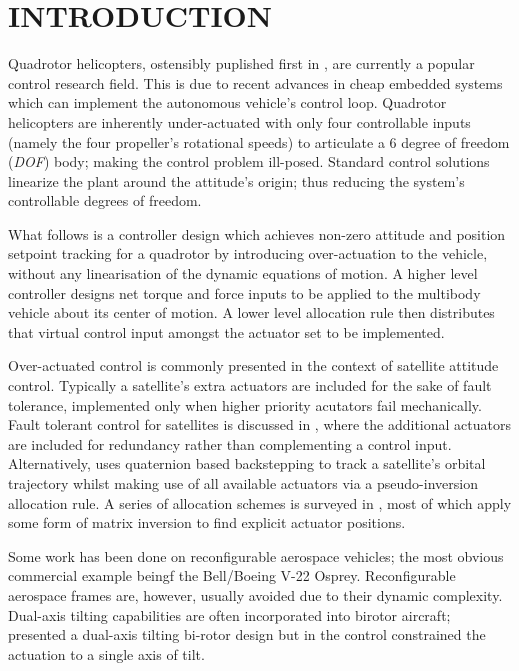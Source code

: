 \documentclass[a4paper, 10pt, conference]{ieeeconf}
\begin{document}
\section{INTRODUCTION}
Quadrotor helicopters, ostensibly puplished first in \cite{x4flyer}, are currently a popular control research field. This is due to recent advances in cheap embedded systems which can implement the autonomous vehicle's control loop. Quadrotor helicopters are inherently under-actuated with only four controllable inputs (namely the four propeller's rotational speeds) to articulate a 6 degree of freedom (\emph{DOF}) body; making the control problem ill-posed. Standard control solutions linearize the plant around the attitude's origin; thus reducing the system's controllable degrees of freedom. 
\par
What follows is a controller design which achieves non-zero attitude and position setpoint tracking for a quadrotor by introducing over-actuation to the vehicle, without any linearisation of the dynamic equations of motion. A higher level controller designs net torque and force inputs to be applied to the multibody vehicle about its center of motion. A lower level allocation rule then distributes that virtual control input amongst the actuator set to be implemented.
\par
Over-actuated control is commonly presented in the context of satellite attitude control. Typically a satellite's extra actuators are included for the sake of fault tolerance, implemented only when higher priority acutators fail mechanically. Fault tolerant control for satellites is discussed in \cite{ftcallocation}, where the additional actuators are included for redundancy rather than complementing a control input. Alternatively, \cite{quaternionbackstep} uses quaternion based backstepping to track a satellite's orbital trajectory whilst making use of all available actuators via a pseudo-inversion allocation rule. A series of allocation schemes is surveyed in \cite{allocation}, most of which apply some form of matrix inversion to find explicit actuator positions.
\par
Some work has been done on reconfigurable aerospace vehicles; the most obvious commercial example beingf the Bell/Boeing V-22 Osprey. Reconfigurable aerospace frames are, however, usually avoided due to their dynamic complexity. Dual-axis tilting capabilities are often incorporated into birotor aircraft; \cite{ggress} presented a dual-axis tilting bi-rotor design but in the control constrained the actuation to a single axis of tilt. 
\end{document}
